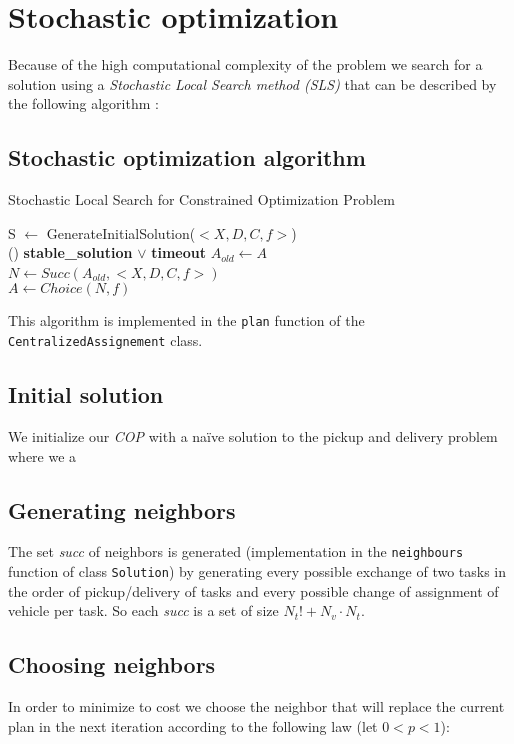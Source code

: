\documentclass[11pt]{article}
\begin{document}
\section{Stochastic optimization}

Because of the high computational complexity of the problem we search for a solution using a \textit{Stochastic Local Search method (SLS)} that can be described by the following algorithm :


\subsection{Stochastic optimization algorithm}
\begin{algorithm}[H]
    \SetAlgoLined
    \caption{Stochastic Local Search for Constrained Optimization Problem}
    S $\leftarrow$ GenerateInitialSolution($<X,D,C,f>$) \\
    \Repeat(){  \textbf{stable\_solution} $\lor$ \textbf{timeout} }{
        $A_{old} \leftarrow A$ \\
        $N \leftarrow Succ(A_{old},<X,D,C,f>)$ \\
        $A \leftarrow Choice(N,f)$
    }
\end{algorithm}
This algorithm is implemented in the \texttt{plan} function of the \texttt{CentralizedAssignement} class.
\subsection{Initial solution}
We initialize our \textit{COP} with a naïve solution to the pickup and delivery problem where we a

\subsection{Generating neighbors}
The set \textit{succ} of neighbors is generated (implementation in the \texttt{neighbours} function of class \texttt{Solution}) by generating  every possible exchange of two tasks in the order of pickup/delivery of tasks and every possible change of assignment of vehicle per task. So each \textit{succ} is a set of size $N_t!+N_v\cdot N_t$.

\subsection{Choosing neighbors}
In order to minimize to cost we choose the neighbor that will replace the current plan in the next iteration according to the following law (let $0<p<1$):
\end{document}
